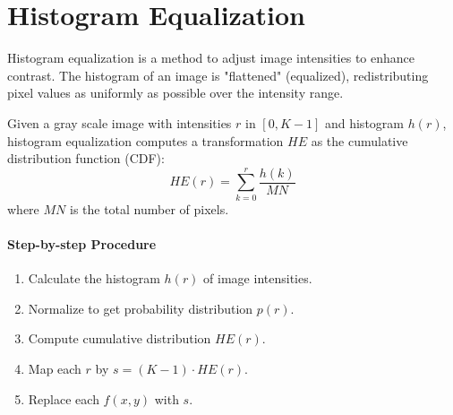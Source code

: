 \section{Histogram Equalization}

Histogram equalization is a method to adjust image intensities to enhance contrast. The histogram of an image is "flattened" (equalized), redistributing pixel values as uniformly as possible over the intensity range.


\noindent Given a gray scale image with intensities $r$ in $[0, K-1]$ and histogram $h(r)$, histogram equalization computes a transformation $HE$ as the cumulative distribution function (CDF):
$$
HE(r) = \sum_{k=0}^{r} \frac{h(k)}{MN}
$$
where $MN$ is the total number of pixels.


\paragraph{Step-by-step Procedure}
\begin{enumerate}
    \item Calculate the histogram $h(r)$ of image intensities.
    \item Normalize to get probability distribution $p(r)$.
    \item Compute cumulative distribution $HE(r)$.
    \item Map each $r$ by $s = (K-1) \cdot HE(r)$.
    \item Replace each $f(x, y)$ with $s$.
\end{enumerate}



